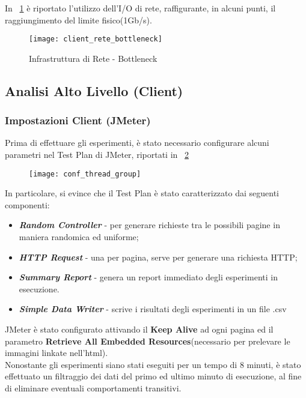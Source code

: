 In \figurename~\ref{webserver_bottleneck_rete} è riportato l'utilizzo dell'I/O di rete,
raffigurante, in alcuni punti, il raggiungimento del limite fisico(1Gb/s).\\
\begin{figure}[!htbp]
  \centering
  \texttt{[image: client\_rete\_bottleneck]}
  \caption{Infrastruttura di Rete - Bottleneck}
  \label{webserver_bottleneck_rete}
\end{figure}

\clearpage

\subsection{Analisi Alto Livello (Client)}
\subsubsection*{Impostazioni Client (JMeter)}
Prima di effettuare gli esperimenti, è stato necessario configurare alcuni parametri
nel Test Plan di JMeter, riportati in \figurename~\ref{webserver_conf_jmeter}

\begin{figure}[!htbp]
  \centering
  \texttt{[image: conf\_thread\_group]}
  \caption{}
  \label{webserver_conf_jmeter}
\end{figure}

In particolare, si evince che il Test Plan è stato caratterizzato dai seguenti
componenti:

\begin{itemize}
  \item \textbf{\textit{Random Controller}} - per generare richieste tra le possibili
  pagine in maniera randomica ed uniforme;
  \item \textbf{\textit{HTTP Request}} - una per pagina, serve per generare una
  richiesta HTTP;
  \item \textbf{\textit{Summary Report}} - genera un report immediato degli esperimenti
  in esecuzione.
  \item \textbf{\textit{Simple Data Writer}} - scrive i risultati degli esperimenti
  in un file .csv
\end{itemize}

JMeter è stato configurato attivando il \textbf{Keep Alive} ad ogni pagina
ed il parametro \textbf{Retrieve All Embedded Resources}(necessario per prelevare
le immagini linkate nell'html).\\
Nonostante gli esperimenti siano stati eseguiti per un tempo di 8 minuti, è stato
effettuato un filtraggio dei dati del primo ed ultimo minuto di esecuzione, al fine
di eliminare eventuali comportamenti transitivi.\\

